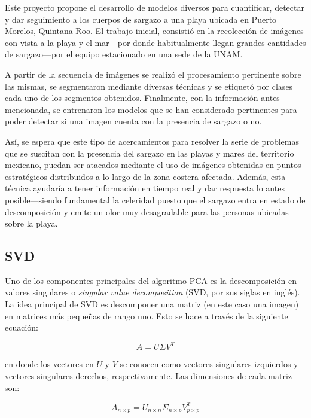 \documentclass[conference]{IEEEtran}
\begin{document}
Este proyecto propone el desarrollo de modelos diversos para cuantificar, detectar y dar seguimiento a los cuerpos de sargazo a una playa ubicada en Puerto Morelos, Quintana Roo. El trabajo inicial, consistió en la recolección de imágenes con vista a la playa y el mar---por donde habitualmente llegan grandes cantidades de sargazo---por el equipo estacionado en una sede de la UNAM.

A partir de la secuencia de imágenes se realizó el procesamiento pertinente sobre las mismas, se segmentaron mediante diversas técnicas y se etiquetó por clases cada uno de los segmentos obtenidos. Finalmente, con la información antes mencionada, se entrenaron los modelos que se han considerado pertinentes para poder detectar si una imagen cuenta con la presencia de sargazo o no.

Así, se espera que este tipo de acercamientos para resolver la serie de problemas que se suscitan con la presencia del sargazo en las playas y mares del territorio mexicano, puedan ser atacados mediante el uso de imágenes obtenidas en puntos estratégicos distribuidos a lo largo de la zona costera afectada. Además, esta técnica ayudaría a tener información en tiempo real y dar respuesta lo antes posible---siendo fundamental la celeridad puesto que el sargazo entra en estado de descomposición y emite un olor muy desagradable para las personas ubicadas sobre la playa.



\subsection{SVD}
Uno de los componentes principales del algoritmo PCA es la descomposición en valores singulares o \textit{singular value decomposition} (SVD, por sus siglas en inglés). La idea principal de SVD es descomponer una matriz (en este caso una imagen) en matrices más pequeñas de rango uno. Esto se hace a través de la siguiente ecuación: 

\begin{equation} \label{eq:svd}
    A = U\Sigma V^T
\end{equation}

en donde los vectores en $U$ y $V$ se conocen como vectores singulares izquierdos y vectores singulares derechos, respectivamente. Las dimensiones de cada matriz son: 

\begin{equation}\label{eq:svd_dimensions}
    A_{n\times p} = U_{n\times n} \Sigma_{n\times p} V_{p\times p}^T
\end{equation}
\end{document}
